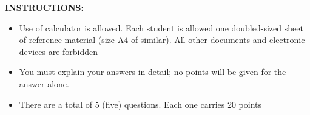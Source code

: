 \documentclass[a4paper]{exam}
\begin{document}
	
	\begin{center}
	\end{center}
	
	\vspace*{1mm}
	\textbf{INSTRUCTIONS:}
	\begin{itemize}
		\item Use of calculator is allowed. Each student is allowed one doubled-sized sheet of reference material (size A4 of similar). All other documents and electronic devices are forbidden
		\item You must explain your answers in detail; no points will be given for the answer alone.
		\item There are a total of 5 (five) questions. Each one carries 20 points
	\end{itemize}
	
\end{document}
